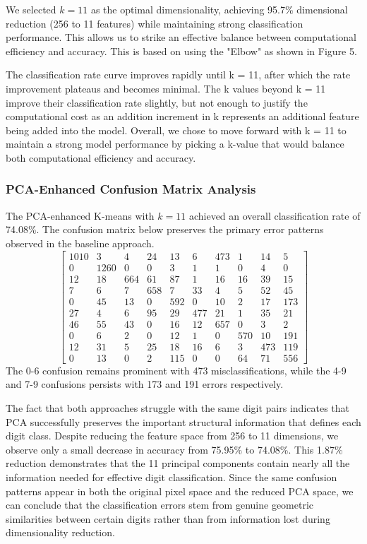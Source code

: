 \documentclass{article}
\begin{document}
We selected $k = 11$ as the optimal dimensionality, achieving 95.7\% dimensional reduction (256 to 11 features) while maintaining strong classification performance. This allows us to strike an effective balance between computational efficiency and accuracy. This is based on using the "Elbow" as shown in Figure 5. 

The classification rate curve improves rapidly until k = 11, after which the rate improvement plateaus and becomes minimal. The k values beyond k = 11 improve their classification rate slightly, but not enough to justify the computational cost as an addition increment in k represents an additional feature being added into the model. Overall, we chose to move forward with k = 11 to maintain a strong model performance by picking a k-value that would balance both computational efficiency and accuracy. 

\subsubsection{PCA-Enhanced Confusion Matrix Analysis}
The PCA-enhanced K-means with $k = 11$ achieved an overall classification rate of 74.08\%. The confusion matrix below preserves the primary error patterns observed in the baseline approach.
\[
\begin{bmatrix}
1010 & 3 & 4 & 24 & 13 & 6 & 473 & 1 & 14 & 5\\
0 & 1260 & 0 & 0 & 3 & 1 & 1 & 0 & 4 & 0\\
12 & 18 & 664 & 61 & 87 & 1 & 16 & 16 & 39 & 15\\
7 & 6 & 7 & 658 & 7 & 33 & 4 & 5 & 52 & 45\\
0 & 45 & 13 & 0 & 592 & 0 & 10 & 2 & 17 & 173\\
27 & 4 & 6 & 95 & 29 & 477 & 21 & 1 & 35 & 21\\
46 & 55 & 43 & 0 & 16 & 12 & 657 & 0 & 3 & 2\\
0 & 6 & 2 & 0 & 12 & 1 & 0 & 570 & 10 & 191\\
12 & 31 & 5 & 25 & 18 & 16 & 6 & 3 & 473 & 119\\
0 & 13 & 0 & 2 & 115 & 0 & 0 & 64 & 71 & 556
\end{bmatrix}
\]
The 0-6 confusion remains prominent with 473 misclassifications, while the 4-9 and 7-9 confusions persists with 173 and 191 errors respectively.

The fact that both approaches struggle with the same digit pairs indicates that PCA successfully preserves the important structural information that defines each digit class. Despite reducing the feature space from 256 to 11 dimensions, we observe only a small decrease in accuracy from 75.95\% to 74.08\%. This 1.87\% reduction demonstrates that the 11 principal components contain nearly all the information needed for effective digit classification. Since the same confusion patterns appear in both the original pixel space and the reduced PCA space, we can conclude that the classification errors stem from genuine geometric similarities between certain digits rather than from information lost during dimensionality reduction.
\end{document}
